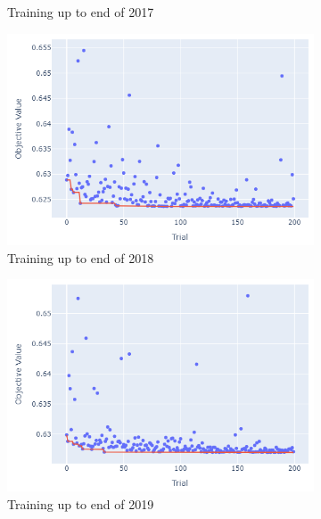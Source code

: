 \documentclass[12pt,twoside]{report}
\begin{document}
\begin{figure}[htb]
\begin{subfigure}{.33\linewidth}
  \caption{Training up to end of 2017}
\end{subfigure}%
\begin{subfigure}{.33\linewidth}
  \centering
  \includegraphics[width=0.95\linewidth]{figures/lr_no_odds_cutoff_2018.png}
  \caption{Training up to end of 2018}
\end{subfigure}
\par\bigskip
\par\bigskip
\begin{subfigure}{.33\linewidth}
  \centering
  \includegraphics[width=0.95\linewidth]{figures/lr_no_odds_cutoff_2019.png}
  \caption{Training up to end of 2019}
\end{subfigure}%
\begin{subfigure}{.33\linewidth}
  \centering

\end{subfigure}
\end{figure}
\end{document}
